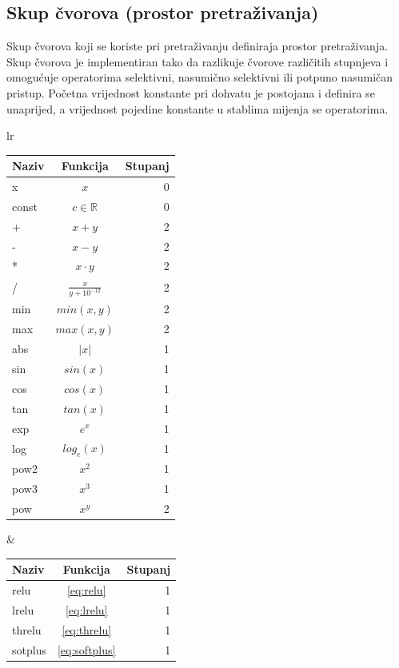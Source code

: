 \documentclass[times, utf8, numeric, diplomski]{fer}
\def\realnum{\mathbb{R}}
\begin{document}
\subsection{Skup čvorova (prostor pretraživanja)}
\label{sec:node_set}
Skup čvorova koji se koriste pri pretraživanju definiraja prostor pretraživanja. Skup čvorova je implementiran tako da razlikuje čvorove različitih stupnjeva i omogućuje operatorima selektivni, nasumično selektivni ili potpuno nasumičan pristup. Početna vrijednost konstante pri dohvatu je postojana i definira se unaprijed, a vrijednost pojedine konstante u stablima mijenja se operatorima.

\begin{table}[H]
\centering
\begin{tabular}[t]{lr}
\begin{tabular}[t]{l|c|r}
\textbf{Naziv} & \textbf{Funkcija} & \textbf{Stupanj} \\
\hline
x		& $x$					& 0 \\
const	& $c \in \realnum$		& 0 \\
\hline
+		& $x + y$				& 2 \\
-		& $x - y$				& 2 \\
*		& $x \cdot y$			& 2 \\
/		& $\frac{x}{y + 10^{-12}}$	& 2 \\
\hline
min		& $min(x, y)$			& 2 \\
max		& $max(x, y)$			& 2 \\
abs		& $|x|$					& 1 \\
\hline
sin		& $sin(x)$				& 1 \\
cos		& $cos(x)$				& 1 \\
tan		& $tan(x)$				& 1 \\
\hline
exp		& $e^x$					& 1 \\
log		& $log_e(x)$				& 1 \\
pow2		& $x^2$					& 1 \\
pow3		& $x^3$					& 1 \\
pow		& $x^y$					& 2 \\
\end{tabular}
& \quad
\begin{tabular}[t]{l|c|r}
\textbf{Naziv} & \textbf{Funkcija} & \textbf{Stupanj} \\
\hline
relu		& \eqref{eq:relu}		& 1 \\
lrelu	& \eqref{eq:lrelu}		& 1 \\
threlu 	& \eqref{eq:threlu}		& 1 \\
sotplus	& \eqref{eq:softplus}	& 1 \\

\end{tabular}
\end{tabular}
\end{table}
\end{document}
